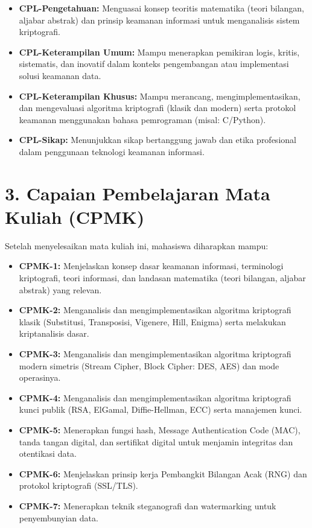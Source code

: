 \documentclass[12pt,a4paper]{article}
\begin{document}
\begin{itemize}[leftmargin=*]
  \item \textbf{CPL-Pengetahuan:} Menguasai konsep teoritis matematika (teori bilangan, aljabar abstrak) dan prinsip keamanan informasi untuk menganalisis sistem kriptografi.
  \item \textbf{CPL-Keterampilan Umum:} Mampu menerapkan pemikiran logis, kritis, sistematis, dan inovatif dalam konteks pengembangan atau implementasi solusi keamanan data.
  \item \textbf{CPL-Keterampilan Khusus:} Mampu merancang, mengimplementasikan, dan mengevaluasi algoritma kriptografi (klasik dan modern) serta protokol keamanan menggunakan bahasa pemrograman (misal: C/Python).
  \item \textbf{CPL-Sikap:} Menunjukkan sikap bertanggung jawab dan etika profesional dalam penggunaan teknologi keamanan informasi.
\end{itemize}

\vspace{0.5cm}

\section*{3. Capaian Pembelajaran Mata Kuliah (CPMK)}

Setelah menyelesaikan mata kuliah ini, mahasiswa diharapkan mampu:

\begin{itemize}[leftmargin=*]
  \item \textbf{CPMK-1:} Menjelaskan konsep dasar keamanan informasi, terminologi kriptografi, teori informasi, dan landasan matematika (teori bilangan, aljabar abstrak) yang relevan.
  \item \textbf{CPMK-2:} Menganalisis dan mengimplementasikan algoritma kriptografi klasik (Substitusi, Transposisi, Vigenere, Hill, Enigma) serta melakukan kriptanalisis dasar.
  \item \textbf{CPMK-3:} Menganalisis dan mengimplementasikan algoritma kriptografi modern simetris (Stream Cipher, Block Cipher: DES, AES) dan mode operasinya.
  \item \textbf{CPMK-4:} Menganalisis dan mengimplementasikan algoritma kriptografi kunci publik (RSA, ElGamal, Diffie-Hellman, ECC) serta manajemen kunci.
  \item \textbf{CPMK-5:} Menerapkan fungsi hash, Message Authentication Code (MAC), tanda tangan digital, dan sertifikat digital untuk menjamin integritas dan otentikasi data.
  \item \textbf{CPMK-6:} Menjelaskan prinsip kerja Pembangkit Bilangan Acak (RNG) dan protokol kriptografi (SSL/TLS).
  \item \textbf{CPMK-7:} Menerapkan teknik steganografi dan watermarking untuk penyembunyian data.
\end{itemize}
\end{document}
